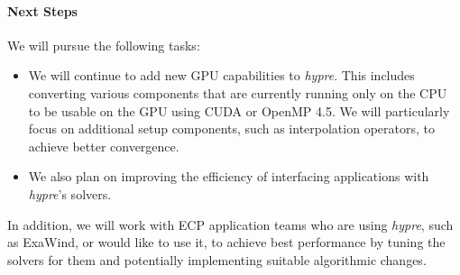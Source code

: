 \paragraph{Next Steps}

We will pursue the following tasks:

\begin{itemize}
\item We will continue to add new GPU capabilities to {\sl hypre}. This includes converting various components that are currently running only on the CPU to be usable on the GPU using CUDA or OpenMP 4.5. We will particularly focus on additional setup components, such as interpolation operators, to achieve better convergence.
\item We also plan on improving the efficiency of interfacing applications with {\sl hypre}'s solvers.
\end{itemize}
In addition, we will work with ECP application teams who are using {\sl hypre}, such as ExaWind, or would like to use it, to achieve best performance by tuning the solvers for them and potentially implementing suitable algorithmic changes. 


